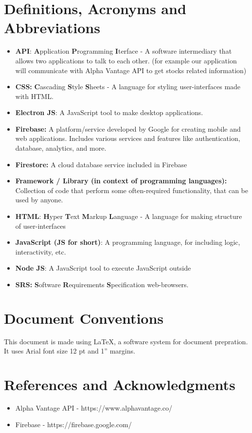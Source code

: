 \documentclass[12 pt, a4paper]{report}
\begin{document}
	\section {Definitions, Acronyms and Abbreviations}
		
	\begin{itemize}
		\item \textbf{API}: \textbf{A}pplication \textbf{P}rogramming \textbf{I}terface - A software intermediary that allows two applications to talk to each other. (for example our application will communicate with Alpha Vantage API to get stocks related information)
		\item \textbf{CSS:} \textbf{C}ascading \textbf{S}tyle \textbf{S}heets - A language for styling user-interfaces made with HTML.
		\item \textbf{Electron JS}: A JavaScript tool to make desktop applications.
		\item \textbf{Firebase:} A platform/service developed by Google for creating mobile and web applications. Includes various services and features like authentication, database, analytics, and more.
		\item \textbf{Firestore:} A cloud database service included in Firebase
		\item \textbf{Framework / Library (in context of programming languages):} Collection of code that perform some often-required functionality, that can be used by anyone.
		\item \textbf{HTML}: \textbf{H}yper  \textbf{T}ext \textbf{M}arkup \textbf{L}anguage - A language for making structure of user-interfaces
		\item \textbf{JavaScript (JS for short)}: A programming language, for including logic, interactivity, etc.
		\item \textbf{Node JS}: A JavaScript tool to execute JavaScript outside
		\item \textbf{SRS:} \textbf{S}oftware \textbf{R}equirements \textbf{S}pecification
		 web-browsers.

		
	\end{itemize}
	
	
	\section {Document Conventions}
	This document is made using LaTeX, a software system for document prepration. It uses Arial font size 12 pt and 1” margins.
	
	\section {References and Acknowledgments}
	\begin{itemize}
		\item Alpha Vantage API - https://www.alphavantage.co/
		\item Firebase - https://firebase.google.com/
	\end{itemize}
	
\end{document}
